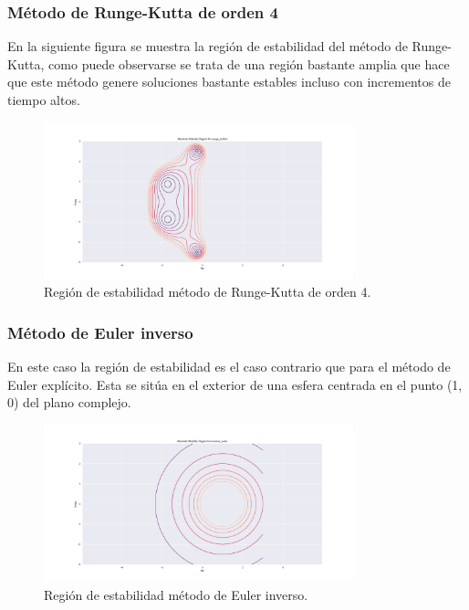 \documentclass[12pt,a4paper]{article}
\begin{document}
\subsubsection{Método de Runge-Kutta de orden 4}
En la siguiente figura se muestra la región de estabilidad del método de Runge-Kutta, como puede observarse se trata de una región bastante amplia que hace que este método genere soluciones bastante estables incluso con incrementos de tiempo altos.
\begin{figure}[H]
	\centering
	\includegraphics[width=0.8\textwidth]{FIGURES/mil4/st_rungekutta4.png}
	\caption{Región de estabilidad método de Runge-Kutta de orden 4.}
	\label{st_rungekutta4}
\end{figure}


\subsubsection{Método de Euler inverso}
En este caso la región de estabilidad es el caso contrario que para el método de Euler explícito. Esta se sitúa en el exterior de una esfera centrada en el punto (1, 0) del plano complejo. 
\begin{figure}[H]
	\centering
	\includegraphics[width=0.8\textwidth]{FIGURES/mil4/st_inveuler.png}
	\caption{Región de estabilidad método de Euler inverso.}
	\label{st_inveuler}
\end{figure}
\end{document}
